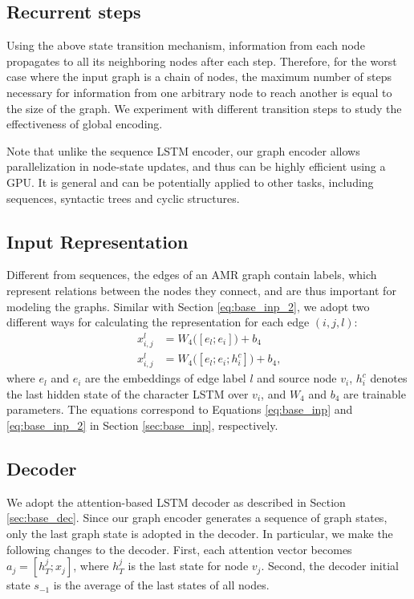 \documentclass[11pt,a4paper]{article}
\begin{document}
\subsection{Recurrent steps}

Using the above state transition mechanism, information from each node propagates to all its neighboring nodes after each step. 
Therefore, for the worst case where the input graph is a chain of nodes, the maximum number of steps necessary for information from one arbitrary node to reach another is equal to the size of the graph. 
We experiment with different transition steps to study the effectiveness of global encoding. 

Note that unlike the sequence LSTM encoder, our graph encoder allows parallelization in node-state updates, and thus can be highly efficient using a GPU\@.
It is general and can be potentially applied to other tasks, including sequences, syntactic trees and cyclic structures. 

\subsection{Input Representation}
\label{sec:input}

Different from sequences, the edges of an AMR graph contain labels, which represent relations between the nodes they connect, and are thus important for modeling the graphs.
Similar with Section \ref{eq:base_inp_2}, we adopt two different ways for calculating the representation for each edge $(i,j,l)$: 
\begin{align}
x_{i,j}^l &= W_4 \Big( [e_l; e_i] \Big) + b_4 \\
x_{i,j}^l &= W_4 \Big( [e_l; e_i; h_i^c] \Big) + b_4 \textrm{,}
\end{align}
where $e_l$ and $e_i$ are the embeddings of edge label $l$ and source node $v_i$, $h_i^c$ denotes the last hidden state of the character LSTM over $v_i$, and $W_4$ and $b_4$ are trainable parameters.
The equations correspond to Equations \ref{eq:base_inp} and \ref{eq:base_inp_2} in Section \ref{sec:base_inp}, respectively.




\subsection{Decoder}



We adopt the attention-based LSTM decoder as described in Section \ref{sec:base_dec}.
Since our graph encoder generates a sequence of graph states, only the last graph state is adopted in the decoder.
In particular, we make the following changes to the decoder. First, each attention vector becomes $a_j=[h_T^j; x_j]$, where $h_T^j$ is the last state for node $v_j$. 
Second, the decoder initial state $s_{-1}$ is the average of the last states of all nodes.
\end{document}

